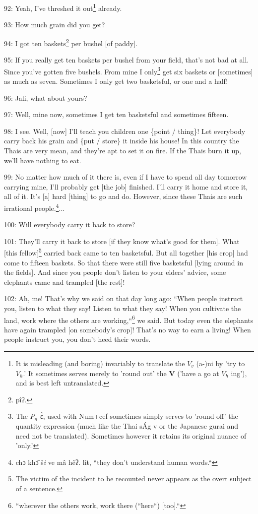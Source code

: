 92: Yeah, I've threshed it out\footnote{It is misleading (and boring) invariably to translate the $V_v$ (a-)ni by 'try to $V_h$.' It sometimes serves merely to 'round out' the \textbf{V} ('have a go at $V_h$ ing'), and is best left untranslated.} already.

93: How much grain did you get?

94: I got ten baskets\footnote{pîʔ.} per bushel [of paddy].

95: If you really get ten baskets per bushel from your field, that's not bad at
all. Since you've gotten five bushels. From mine I only\footnote{The $P_n$ ɛ̀, used with Num+cef sometimes simply serves to 'round off' the quantity expression (much like the Thai sÁg v or the Japanese gurai and need not be translated). Sometimes however it retains its original nuance of 'only.'} get six baskets or
[sometimes] as much as seven. Sometimes I only get two basketsful, or one and a
half!

96: Jali, what about yours?

97: Well, mine now, sometimes I get ten basketsful and sometimes fifteen.

98: I see. Well, [now] I'll teach you children one \{point / thing\}! Let everybody
carry back his grain and \{put / store\} it inside his house! In this country the
Thais are very mean, and they're apt to set it on fire. If the Thais burn it up,
we'll have nothing to eat.

99: No matter how much of it there is, even if I have to spend all day tomorrow
carrying mine, I'll probably get [the job] finished. I'll carry it home and store
it, all of it. It's [a] hard [thing] to go and do. However, since these Thais are
such irrational people.\footnote{chɔ khɔ̂ š\emph{i} ve mâ hêʔ. lit, ``they don't understand human words.``}...

100: Will everybody carry it back to store?

101: They'll carry it back to store [if they know what's good for them]. What [this
fellow]\footnote{The victim of the incident to be recounted never appears as the overt subject of a sentence.}\textbf{  }carried back came to ten basketsful. But all together [his
crop] had come to fifteen baskets. So that there were still five basketsful [lying
around in the fields]. And since you people don't listen to your elders' advice,
some elephants came and trampled [the rest]!

102: Ah, me! That's why we said on that day long ago: ``When people instruct
you, listen to what they say! Listen to what they say! When you cultivate the land,
work where the others are working,``\footnote{``wherever the others work, work there (``here``) [too].``} we said. But today even the elephants
have again trampled [on somebody's crop]! That's no way to earn a living! When
people instruct you, you don't heed their words.

